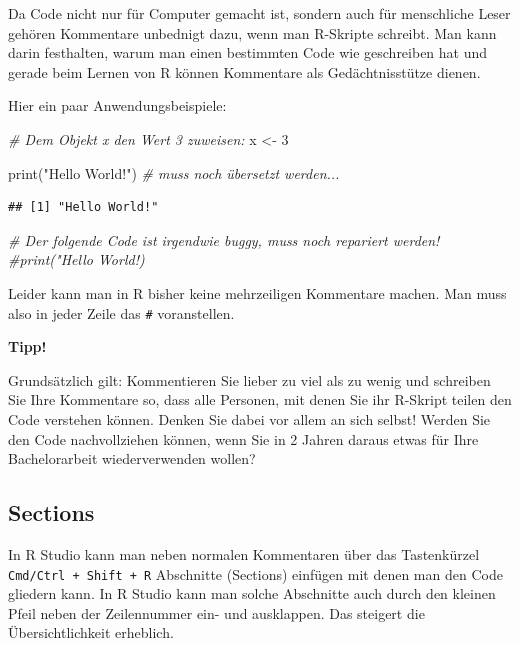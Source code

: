 \documentclass[
]{book}
\newenvironment{Shaded}{\begin{snugshade}}{\end{snugshade}}
\newcommand{\CommentTok}[1]{\textcolor[rgb]{0.56,0.35,0.01}{\textit{#1}}}
\newcommand{\DecValTok}[1]{\textcolor[rgb]{0.00,0.00,0.81}{#1}}
\newcommand{\FunctionTok}[1]{\textcolor[rgb]{0.00,0.00,0.00}{#1}}
\newcommand{\NormalTok}[1]{#1}
\newcommand{\OtherTok}[1]{\textcolor[rgb]{0.56,0.35,0.01}{#1}}
\newcommand{\StringTok}[1]{\textcolor[rgb]{0.31,0.60,0.02}{#1}}
\begin{document}
Da Code nicht nur für Computer gemacht ist, sondern auch für menschliche Leser gehören Kommentare unbednigt dazu, wenn man R-Skripte schreibt. Man kann darin festhalten, warum man einen bestimmten Code wie geschreiben hat und gerade beim Lernen von R können Kommentare als Gedächtnisstütze dienen.

Hier ein paar Anwendungsbeispiele:

\begin{Shaded}
\begin{Highlighting}[]
\CommentTok{\# Dem Objekt x den Wert 3 zuweisen:}
\NormalTok{x }\OtherTok{\textless{}{-}} \DecValTok{3}

\FunctionTok{print}\NormalTok{(}\StringTok{"Hello World!"}\NormalTok{) }\CommentTok{\# muss noch übersetzt werden...}
\end{Highlighting}
\end{Shaded}

\begin{verbatim}
## [1] "Hello World!"
\end{verbatim}

\begin{Shaded}
\begin{Highlighting}[]
\CommentTok{\# Der folgende Code ist irgendwie buggy, muss noch repariert werden!}
\CommentTok{\#print("Hello World!)}
\end{Highlighting}
\end{Shaded}

Leider kann man in R bisher keine mehrzeiligen Kommentare machen. Man muss also in jeder Zeile das \texttt{\#} voranstellen.

\textbf{Tipp!}

Grundsätzlich gilt: Kommentieren Sie lieber zu viel als zu wenig und schreiben Sie Ihre Kommentare so, dass alle Personen, mit denen Sie ihr R-Skript teilen den Code verstehen können. Denken Sie dabei vor allem an sich selbst! Werden Sie den Code nachvollziehen können, wenn Sie in 2 Jahren daraus etwas für Ihre Bachelorarbeit wiederverwenden wollen?

\hypertarget{sections}{%
\subsection{Sections}\label{sections}}

In R Studio kann man neben normalen Kommentaren über das Tastenkürzel \texttt{Cmd/Ctrl\ +\ Shift\ +\ R} Abschnitte (Sections) einfügen mit denen man den Code gliedern kann. In R Studio kann man solche Abschnitte auch durch den kleinen Pfeil neben der Zeilennummer ein- und ausklappen. Das steigert die Übersichtlichkeit erheblich.
\end{document}
